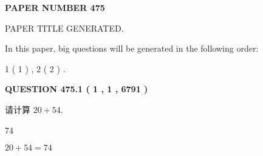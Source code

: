 \documentclass{ctexart}
\begin{document}
   
   
   
\newpage 
\setcounter{page}{ 
   475001 } 
   
   
   
   
 {\textbf{ \Large{ PAPER NUMBER  475  }}}
   
   
\vspace{0.2in}
   
   
   
   
   
   
   
   
 \vspace{0.2in}
 
 
 
 
   
   
 PAPER TITLE GENERATED.
   
   
   
\vspace{0.2in}
   
In this paper, big questions will be generated in the following order: 
   
   
   1 ( 1 )
 ,
   2 ( 2 )
 .
  
\vspace{0.2in}
  
{\textbf{\Large{QUESTION
475.1 
 ( 1 , 1 , 6791 )
}}}
  
  
 
请计算 $ %
20 +  %
54 $.
 
 
 
\noindent{}
 
 

74
 
 
\noindent{}
 
 

 
 
 
\noindent{}
 
 

$ %
20 +  %
54=   %
74$
 
 
\noindent{}
 
 

 
   
   
   
\end{document}
